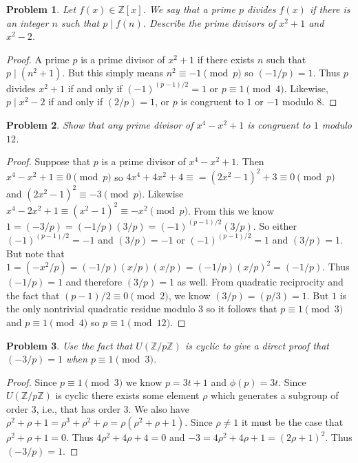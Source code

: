 \documentclass{article}
\newtheorem{problem}{Problem}
\begin{document}
\begin{problem}
Let $f(x) \in \mathbb{Z}[x]$. We say that a prime $p$ divides $f(x)$ if there is an integer $n$ such that $p \mid f(n)$. Describe the prime divisors of $x^2 + 1$ and $x^2 -2$.
\end{problem}
\begin{proof}
A prime $p$ is a prime divisor of $x^2 + 1$ if there exists $n$ such that $p \mid (n^2 + 1)$. But this simply means $n^2 \equiv -1 \pmod{p}$ so $(-1/p) = 1$. Thus $p$ divides $x^2 + 1$ if and only if $(-1)^{(p-1)/2} = 1$ or $p \equiv 1 \pmod{4}$. Likewise, $p \mid x^2 - 2$ if and only if $(2/p) = 1$, or $p$ is congruent to $1$ or $-1$ modulo $8$.
\end{proof}

\begin{problem}
Show that any prime divisor of $x^4 - x^2 + 1$ is congruent to $1$ modulo $12$.
\end{problem}
\begin{proof}
Suppose that $p$ is a prime divisor of $x^4 - x^2 + 1$. Then $x^4 - x^2 + 1 \equiv 0 \pmod{p}$ so $4x^4 + 4x^2 + 4 \equiv = (2x^2 - 1)^2 + 3 \equiv 0 \pmod{p}$ and $(2x^2 - 1)^2 \equiv -3 \pmod{p}$. Likewise $x^4 - 2x^2 + 1 \equiv (x^2 - 1)^2 \equiv -x^2 \pmod{p}$. From this we know $1 = (-3/p) = (-1/p)(3/p) = (-1)^{(p-1)/2} (3/p)$. So either $(-1)^{(p-1)/2} = -1$ and $(3/p) = -1$ or $(-1)^{(p-1)/2} = 1$ and $(3/p) = 1$. But note that $1 = (-x^2/p) = (-1/p)(x/p)(x/p) = (-1/p)(x/p)^2 = (-1/p)$. Thus $(-1/p) = 1$ and therefore $(3/p) = 1$ as well. From quadratic reciprocity and the fact that $(p-1)/2 \equiv 0 \pmod{2}$, we know $(3/p) = (p/3) = 1$. But $1$ is the only nontrivial quadratic residue modulo $3$ so it follows that $p \equiv 1 \pmod{3}$ and $p \equiv 1 \pmod{4}$ so $p \equiv 1 \pmod{12}$.
\end{proof}

\begin{problem}
Use the fact that $U(\mathbb{Z}/p\mathbb{Z})$ is cyclic to give a direct proof that $(-3/p) = 1$ when $p \equiv 1 \pmod{3}$.
\end{problem}
\begin{proof}
Since $p \equiv 1 \pmod{3}$ we know $p = 3t + 1$ and $\phi(p) = 3t$. Since $U(\mathbb{Z}/p\mathbb{Z})$ is cyclic there exists some element $\rho$ which generates a subgroup of order $3$, i.e., that has order $3$. We also have $\rho^2 + \rho + 1 = \rho^3 + \rho^2 + \rho = \rho(\rho^2 + \rho + 1)$. Since $\rho \neq 1$ it must be the case that $\rho^2 + \rho + 1 = 0$. Thus $4\rho^2 + 4\rho + 4 = 0$ and $-3 = 4\rho^2 + 4\rho + 1 = (2\rho +1)^2$. Thus $(-3/p) = 1$.
\end{proof}
\end{document}
